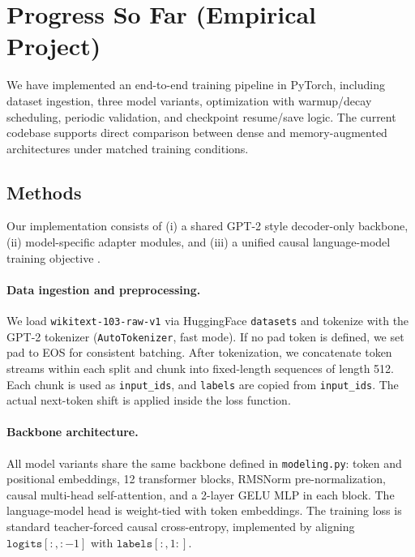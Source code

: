 \documentclass[11pt]{article}
\begin{document}
\section{Progress So Far (Empirical Project)}
We have implemented an end-to-end training pipeline in PyTorch, including dataset ingestion, three model variants, optimization with warmup/decay scheduling, periodic validation, and checkpoint resume/save logic.
The current codebase supports direct comparison between dense and memory-augmented architectures under matched training conditions.

\subsection{Methods}
Our implementation consists of (i) a shared GPT-2 style decoder-only backbone, (ii) model-specific adapter modules, and (iii) a unified causal language-model training objective \cite{radford2019language}.

\paragraph{Data ingestion and preprocessing.}
We load \texttt{wikitext-103-raw-v1} via HuggingFace \texttt{datasets} and tokenize with the GPT-2 tokenizer (\texttt{AutoTokenizer}, fast mode).
If no pad token is defined, we set pad to EOS for consistent batching.
After tokenization, we concatenate token streams within each split and chunk into fixed-length sequences of length 512.
Each chunk is used as \texttt{input\_ids}, and \texttt{labels} are copied from \texttt{input\_ids}.
The actual next-token shift is applied inside the loss function.

\paragraph{Backbone architecture.}
All model variants share the same backbone defined in \texttt{modeling.py}:
token and positional embeddings, 12 transformer blocks, RMSNorm pre-normalization, causal multi-head self-attention, and a 2-layer GELU MLP in each block.
The language-model head is weight-tied with token embeddings.
The training loss is standard teacher-forced causal cross-entropy, implemented by aligning $\texttt{logits}[:, :-1]$ with $\texttt{labels}[:, 1:]$.
\end{document}
